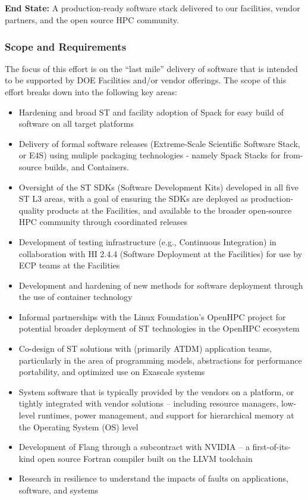 \subsection{ \ecosystem}\label{subsect:ecosystem}

\textbf{End State:} A production-ready software stack delivered to our facilities, vendor partners, and the open source HPC community.

\subsubsection{Scope and Requirements}
The focus of this effort is on the ``last mile'' delivery of software that is intended to be supported by DOE Facilities and/or vendor offerings. The scope of this effort breaks down into the following key areas:
\begin{itemize}
	\item Hardening and broad ST and facility adoption of Spack for easy build of software on all target platforms
        \item Delivery of formal software releases (Extreme-Scale Scientific Software Stack, or E4S) using muliple packaging technologies - namely Spack Stacks for from-source builds, and Containers.
	\item Oversight of the ST SDKs (Software Development Kits) developed in all five ST L3 areas, with a goal of ensuring the SDKs are deployed as production-quality products at the Facilities, and available to the broader open-source HPC community through coordinated releases
	\item Development of testing infrastructure (e.g., Continuous Integration) in collaboration with HI 2.4.4 (Software Deployment at the Facilities) for use by ECP teams at the Facilities
	\item Development and hardening of new methods for software deployment through the use of container technology
	\item Informal partnerships with the Linux Foundation's OpenHPC project for potential broader deployment of ST technologies in the OpenHPC ecosystem
	\item Co-design of ST solutions with (primarily ATDM) application teams, particularly in the area of programming models, abstractions for performance portability, and optimized use on Exascale systems
	\item System software that is typically provided by the vendors on a platform, or tightly integrated with vendor solutions – including resource managers, low-level runtimes, power management, and support for hierarchical memory at the Operating System (OS) level
	\item Development of Flang through a subcontract with NVIDIA – a first-of-its-kind open source Fortran compiler built on the LLVM toolchain
	\item Research in resilience to understand the impacts of faults on applications, software, and systems
\end{itemize}
